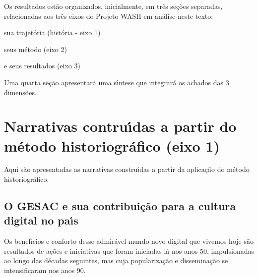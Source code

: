 \documentclass[
12pt,		%
openright,	%
twoside,  %
a4paper,			%
chapter=TITLE,		%
english,			%
french,				%
spanish,			%
brazil				%
]{USPSC-classe/USPSC}
\begin{document}
Os resultados est\~ao organizados, inicialmente, em tr\^es se\c{c}\~oes separadas, relacionadas aos tr\^es eixos do Projeto WASH em an\'alise neste texto:











\begin{alineas}
\item sua trajet\'oria (hist\'oria - eixo 1)
\item seus m\'etodo (eixo 2)
\item e seus resultados (eixo 3)
\end{alineas}

Uma quarta se\c{c}\~ao apresentar\'a uma s\'{\i}ntese que integrar\'a os achados das 3 dimens\~oes.










\section[Narrativas contru\'{\i}das a partir do m\'etodo historiogr\'afico (eixo 1)]{Narrativas contru\'{\i}das a partir do m\'etodo historiogr\'afico (eixo 1)}\label{Narrativas contru\'{\i}das a partir do m\'etodo historiogr\'afico (eixo 1)}
Aqui s\~ao apresentadas as narrativas constru\'{\i}das a partir da aplica\c{c}\~ao do m\'etodo historiogr\'afico.










\subsection[O GESAC e sua contribui\c{c}\~ao para  a cultura  digital  no pa\'{\i}s]{O GESAC e sua contribui\c{c}\~ao para  a cultura  digital  no pa\'{\i}s}\label{O GESAC e sua contribui\c{c}\~ao para  a cultura  digital  no pa\'{\i}s}
Os benef\'{\i}cios e conforto desse admir\'avel mundo novo digital que vivemos hoje s\~ao resultados de a\c{c}\~oes e iniciativas que foram iniciadas l\'a nos anos 50, impulsionadas ao longo das d\'ecadas seguintes, mas cuja populariza\c{c}\~ao e dissemina\c{c}\~ao se intensificaram nos anos 90.
\end{document}
